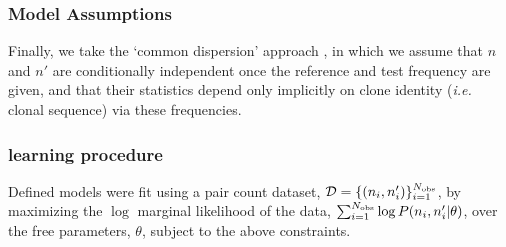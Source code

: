 \documentclass[letterpaper,english,prl,reprint,longbibliography]{revtex4-1} %
\begin{document}


\subsubsection*{Model Assumptions}
Finally, we take the `common dispersion' approach \citep{Robinson2008}, in which we assume that $n$ and $n'$ are conditionally independent once the reference and test frequency are given, and that their statistics depend only implicitly on clone identity (\emph{i.e.} clonal sequence) via these frequencies.

\subsubsection*{learning procedure}
Defined models were fit using a pair count dataset, $\mathcal{D}=\{(n_i,n'_i)\}_{i=1}^{N_{\textrm{\textrm{obs}}}}$, by maximizing the $\log$ marginal likelihood of the data, $\sum_{i=1}^{N_{\textrm{\textrm{obs}}}} \log P(n_i,n'_i|\theta)$, over the free parameters, $\theta$, subject to the above constraints.
\end{document}
